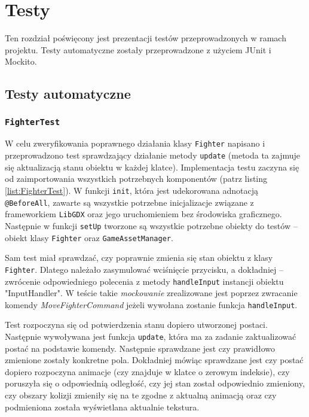 \chapter{Testy}
Ten rozdział poświęcony jest prezentacji testów przeprowadzonych w ramach projektu. Testy automatyczne zostały przeprowadzone z użyciem JUnit i Mockito.

\section{Testy automatyczne}
\subsection{\texttt{FighterTest}}

W celu zweryfikowania poprawnego działania klasy \texttt{Fighter} napisano i przeprowadzono test sprawdzający działanie metody \texttt{update} (metoda ta zajmuje się aktualizacją stanu obiektu w każdej klatce). Implementacja testu zaczyna się od zaimportowania wszystkich potrzebnych komponentów (patrz listing \ref{list:FighterTest}). W funkcji \texttt{init}, która jest udekorowana adnotacją \texttt{@BeforeAll}, zawarte są wszystkie potrzebne inicjalizacje związane z frameworkiem \texttt{LibGDX} oraz jego uruchomieniem bez środowiska graficznego. Następnie w funkcji \texttt{setUp} tworzone są wszystkie potrzebne obiekty do testów -- obiekt klasy \texttt{Fighter} oraz \texttt{GameAssetManager}. 

Sam test miał sprawdzać, czy poprawnie zmienia się stan obiektu z klasy \texttt{Fighter}. Dlatego należało zasymulować wciśnięcie przycisku, a dokładniej -- zwrócenie odpowiedniego polecenia z metody \texttt{handleInput} instancji obiektu "InputHandler". W teście takie \emph{mockowanie} zrealizowane jest poprzez zwracanie komendy \emph{MoveFighterCommand} jeżeli wywołana zostanie funkcja \texttt{handleInput}.

Test rozpoczyna się od potwierdzenia stanu dopiero utworzonej postaci. Następnie wywoływana jest funkcja \texttt{update}, która ma za zadanie zaktualizować postać na podstawie komendy. Następnie sprawdzane jest czy prawidłowo zmienione zostały konkretne pola. Dokładniej mówiąc sprawdzane jest czy postać dopiero rozpoczyna animacje (czy znajduje w klatce o zerowym indeksie), czy poruszyła się o odpowiednią odległość, czy jej stan został odpowiednio zmieniony, czy obszary kolizji zmieniły się na te zgodne z aktualną animacją oraz czy podmieniona została wyświetlana aktualnie tekstura. 

